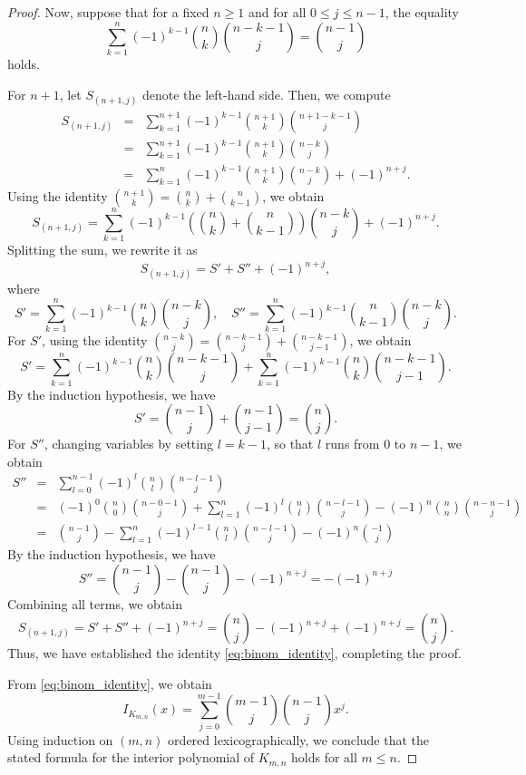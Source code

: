 \documentclass{amsart}
\theoremstyle{definition}
\theoremstyle{remark}
\numberwithin{equation}{section}
\begin{document}
\begin{proof}
Now, suppose that for a fixed $n \geq 1$ and for all $0 \le j \le n-1$, the equality
\[
\sum_{k=1}^{n}(-1)^{k-1}\binom{n}{k}\binom{n-k-1}{j} = \binom{n-1}{j}
\]
holds.

For $ n+1$, let $S_{(n+1,j)}$ denote the left-hand side. Then, we compute
\begin{eqnarray*}
S_{(n+1,j)} &=& \sum_{k=1}^{n+1} (-1)^{k-1}\binom{n+1}{k}\binom{n+1-k-1}{j} \\
&=& \sum_{k=1}^{n+1} (-1)^{k-1}\binom{n+1}{k}\binom{n-k}{j}  \\
&=& \sum_{k=1}^{n} (-1)^{k-1}\binom{n+1}{k}\binom{n-k}{j} + (-1)^{n+j}.
\end{eqnarray*}
Using the identity $\binom{n+1}{k} = \binom{n}{k} + \binom{n}{k-1}$, we obtain
\[
S_{(n+1,j)} = \sum_{k=1}^{n} (-1)^{k-1} \left( \binom{n}{k} + \binom{n}{k-1} \right) \binom{n-k}{j} + (-1)^{n+j}.
\]
Splitting the sum, we rewrite it as
\[
S_{(n+1,j)} = S' + S'' + (-1)^{n+j},
\]
where
\[
S' = \sum_{k=1}^{n} (-1)^{k-1} \binom{n}{k} \binom{n-k}{j}, \quad
S'' = \sum_{k=1}^{n} (-1)^{k-1} \binom{n}{k-1} \binom{n-k}{j}.
\]
For $S'$, using the identity $\binom{n-k}{j} = \binom{n-k-1}{j} + \binom{n-k-1}{j-1}$, we obtain
\[
S' = \sum_{k=1}^{n} (-1)^{k-1} \binom{n}{k} \binom{n-k-1}{j}
+ \sum_{k=1}^{n} (-1)^{k-1} \binom{n}{k} \binom{n-k-1}{j-1}.
\]
By the induction hypothesis, we have
\[
S' = \binom{n-1}{j} + \binom{n-1}{j-1} = \binom{n}{j}.
\]
For $S''$, changing variables by setting $l=k-1$, so that $l$ runs from $0$ to $n-1$, we obtain
\begin{eqnarray*}
S'' 
&=& \sum_{l=0}^{n-1} (-1)^{l}\binom{n}{l}\binom{n-l-1}{j} \\
&=&(-1)^{0}\binom{n}{0}\binom{n-0-1}{j}+\sum_{l=1}^{n} (-1)^{l}\binom{n}{l}\binom{n-l-1}{j}-(-1)^{n}\binom{n}{n}\binom{n-n-1}{j} \\
&=&\binom{n-1}{j}-\sum_{l=1}^{n} (-1)^{l-1}\binom{n}{l}\binom{n-l-1}{j}-(-1)^n\binom{-1}{j}
\end{eqnarray*}
By the induction hypothesis, we have
\[
S''=\binom{n-1}{j}-\binom{n-1}{j}-(-1)^{n+j}=-(-1)^{n+j}
\]
Combining all terms, we obtain
\[
S_{(n+1, j)} =S' + S'' +(-1)^{n+j} 
= \binom{n}{j}-(-1)^{n+j} +(-1)^{n+j} 
= \binom{n}{j}.
\]
Thus, we have established the identity \eqref{eq:binom_identity}, completing the proof.

From \eqref{eq:binom_identity}, we obtain 
\[
I_{K_{m,n}}(x)=\sum_{j=0}^{m-1}\binom{m-1}{j}\binom{n-1}{j}x^j.
\]
Using induction on $(m,n)$ ordered lexicographically, we conclude that the stated formula for the interior polynomial of $K_{m,n}$ holds for all $ m \le n$.
\end{proof}
\end{document}
